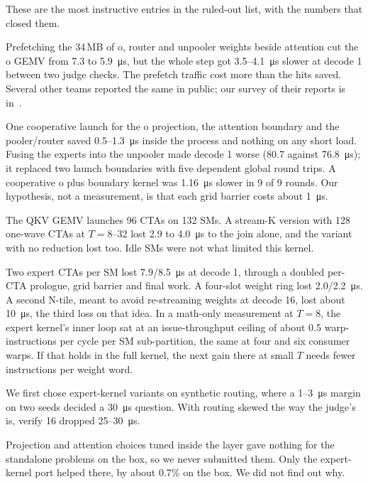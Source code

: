 \documentclass[11pt]{article}
\begin{document}
These are the most instructive entries in the ruled-out list, with the numbers
that closed them.
\begin{description}[style=unboxed,leftmargin=0pt]
  \item[L2 prefetch of later weights during attention.] Prefetching the 34\,MB of
  o, router and unpooler weights beside attention cut the o GEMV from 7.3 to
  \SI{5.9}{\micro\second}, but the whole step got 3.5--\SI{4.1}{\micro\second} slower
  at decode 1 between two judge checks. The prefetch traffic cost more than the hits
  saved. Several other teams reported the same in public; our survey of their reports is
in~\cite{publicsurvey}.
  \item[Fusing across stage boundaries.] One cooperative launch for the o projection,
  the attention boundary and the pooler/router saved 0.5--\SI{1.3}{\micro\second}
  inside the process and nothing on any short load. Fusing the experts into the
  unpooler made decode 1 worse (80.7 against \SI{76.8}{\micro\second}); it replaced
  two launch boundaries with five dependent global round trips. A cooperative o
  plus boundary kernel was \SI{1.16}{\micro\second} slower in 9 of 9 rounds. Our
  hypothesis, not a measurement, is that each grid barrier costs about
  \SI{1}{\micro\second}.
  \item[Using idle SMs.] The QKV GEMV launches 96 CTAs on 132 SMs. A stream-K
  version with 128 one-wave CTAs at $T = 8$--32 lost \SI{2.9}{} to
  \SI{4.0}{\micro\second} to the join alone, and the variant with no reduction lost
  too. Idle SMs were not what limited this kernel.
  \item[More concurrency in the expert kernel.] Two expert CTAs per SM lost
  7.9/\SI{8.5}{\micro\second} at decode 1, through a doubled per-CTA prologue,
  grid barrier and final work. A four-slot weight ring lost
  2.0/\SI{2.2}{\micro\second}. A second N-tile, meant to avoid re-streaming weights
  at decode 16, lost about \SI{10}{\micro\second}, the third loss on that idea. In a
  math-only measurement at $T = 8$, the expert kernel's inner loop sat at an
  issue-throughput ceiling of about 0.5 warp-instructions per cycle per SM
  sub-partition, the same at four and six consumer warps. If that holds in the full
  kernel, the next gain there at small $T$ needs fewer instructions per weight
  word.
  \item[Synthetic routing.] We first chose expert-kernel variants on synthetic
  routing, where a 1--\SI{3}{\micro\second} margin on two seeds decided a
  \SI{30}{\micro\second} question. With routing skewed the way the judge's is, verify
  16 dropped 25--\SI{30}{\micro\second}.
  \item[Porting layer wins back to the standalone problems.] Projection and
  attention choices tuned inside the layer gave nothing for the standalone
  problems on the box, so we never submitted them. Only the expert-kernel port
  helped there, by about 0.7\% on the box. We did not find out why.
\end{description}
\end{document}
